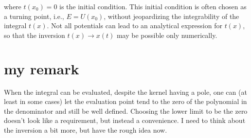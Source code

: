 where $t(x_{0}) = 0$ is the initial condition. This initial condition is often chosen as a turning point, i.e., $E = U(x_{0})$, without jeopardizing the integrability of the integral $t(x)$. Not all potentials can lead to an analytical expression for $t(x)$, so that the inversion $t(x) \rightarrow x(t)$ may be possible only numerically.

\section{my remark}

When the integral can be evaluated, despite the kernel having a pole, one can (at least in some cases) let the evaluation point tend to the zero of the polynomial in the denominator and still be well defined.  Choosing the lower limit to be the zero doesn't look like a requirement, but instead a convenience.  I need to think about the inversion a bit more, but have the rough idea now.  

\EndNoBibArticle
